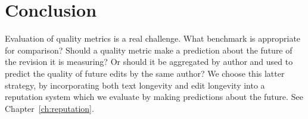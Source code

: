 \section{Conclusion}

Evaluation of quality metrics is a real challenge.
What benchmark is appropriate for comparison?
Should a quality metric make a prediction about
the future of the revision it is measuring?
Or should it be aggregated by author and used
to predict the quality of future edits by the
same author?
We choose this latter strategy, by incorporating
both text longevity and edit longevity into a reputation
system which we evaluate by making predictions about the
future.
See Chapter~\ref{ch:reputation}.


